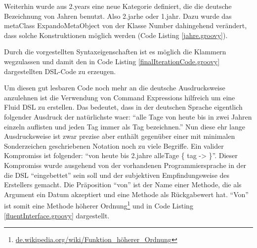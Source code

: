 \documentclass[11pt,english,ngerman, headsepline]{scrreprt}
\begin{document}
Weiterhin wurde aus 2.years eine neue Kategorie definiert, die die deutsche
Bezeichnung von Jahren benutzt. Also 2.jarhe oder 1.jahr.
Dazu wurde das metaClass ExpandoMetaObject von der Klasse Number
dahingehend verändert, dass solche Konstruktionen möglich werden (Code Listing
 \ref{jahre.groovy}).



Durch die vorgestellten Syntaxeigenschaften ist es möglich die Klammern
wegzulassen und damit den in Code Listing \ref{finalIterationCode.groovy}
dargestellten DSL-Code zu erzeugen.



Um diesen gut lesbaren Code noch mehr an die deutsche Ausdrucksweise anzulehnen
ist die Verwendung von Command Expressions hilfreich um eine Fluid DSL zu
erstellen. Das bedeutet, dass in der deutschen Sprache eigentlich folgender
Ausdruck der natürlichste waer: ``alle Tage von heute bis in zwei Jahren
einzeln auflisten und jeden Tag immer als Tag bezeichnen.'' Nun diese ehr lange
Ausdrucksweise ist zwar prezise aber enthält gegenüber einer mit
minimalen Sonderzeichen geschriebenen Notation noch zu viele Begriffe.
Ein valider Kompromiss ist folgender: ``von heute bis 2.jahre alleTage \{ tag
-> \}''.
Dieser Kompromiss wurde ausgehend von der vorhandenen Programmiersprache in der
die DSL ``eingebettet'' sein soll und der subjektiven Empfindungsweise des
Erstellers gemacht. 
Die Präposition ``von'' ist der Name einer Methode, die als Argument ein Datum
akzeptiert und eine Methode als Rückgabewert hat.
``Von'' ist somit eine Methode höherer
Ordnung\footnote{ \url{de.wikipedia.org/wiki/Funktion_höherer_Ordnung} } und
in Code Listing \ref{fluentInterface.groovy} dargestellt.


\end{document}
